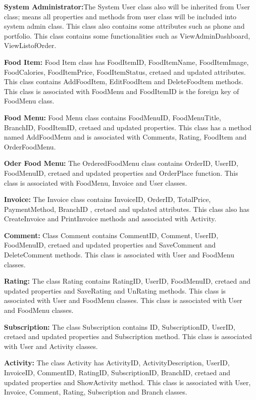 \textbf{System Administrator:}The System User class also will be inherited from
User class; means all properties and methods from user class will be included
into system admin class. This class also contains some attributes such as phone
and portfolio. This class contains some functionalities such as
ViewAdminDashboard, ViewListofOrder.

\textbf{Food Item:} Food Item class has FoodItemID, FoodItemName, FoodItemImage,
FoodCalories, FoodItemPrice, FoodItemStatus, cretaed and updated attributes.
This class contains AddFoodItem, EditFoodItem and DeleteFoodtem methods. This
class is associated with FoodMenu and FoodItemID is the foreign key of FoodMenu
class.

\textbf{Food Menu:} Food Menu class contains FoodMenuID, FoodMenuTitle,
BranchID, FoodItemID, cretaed and updated properties.
This class has a method named AddFoodMenu and is associated with Comments,
Rating, FoodItem and OrderFoodMenu.

\textbf{Oder Food Menu:} The OrderedFoodMenu class contains OrderID, UserID,
FoodMenuID, cretaed and updated properties and OrderPlace function. This class
is associated with FoodMenu, Invoice and User classes.

\textbf{Invoice:} The Invoice class contains InvoiceID, OrderID, TotalPrice,
PaymentMethod, BranchID , cretaed and updated attributes. This class also has
CreateInvoice and PrintInvoice methods and associated with Activity.


\textbf{Comment:} Class Comment contains CommentID, Comment, UserID,
FoodMenuID, cretaed and updated properties and SaveComment and DeleteComment
methods. This class is associated with User and FoodMenu classes.

\textbf{Rating:} The class Rating contains RatingID, UserID, FoodMenuID,
cretaed and updated properties and SaveRating and UnRating methods. This class
is associated with User and FoodMenu classes. This class is associated with User
and FoodMenu classes.

\textbf{Subscription:} The class Subscription contains ID, SubscriptionID,
UserID, cretaed and updated properties and Subscription method. This class is
associated with User and Activity classes.

\textbf{Activity:} The class Activity has ActivityID, ActivityDescription,
UserID, InvoiceID, CommentID, RatingID, SubscriptionID, BranchID, cretaed and
updated properties and ShowActivity method. This class is associated with User,
Invoice, Comment, Rating, Subscription and Branch classes.


